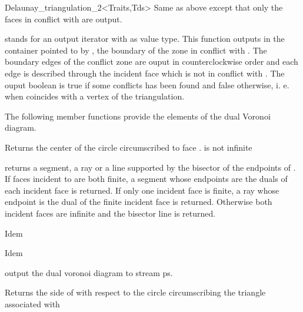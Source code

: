 \begin{ccRefClass}{Delaunay_triangulation_2<Traits,Tds>}
{Same as above except that only the faces in conflict with 
are output.}

{  stands for an output iterator with  as value
type.
 This function  outputs in the container pointed to by ,
the boundary of the zone in conflict with . The boundary edges
of the conflict  zone are ouput in counterclockwise order
and each edge is described  through the incident face
which is not in conflict with .
The ouput boolean is true if some conflicts has been found and false
otherwise,
i. e. when  coincides with a vertex of the triangulation.}



The following member functions provide the elements of the
dual Voronoi diagram.

{Returns the center of the circle circumscribed to face .
\ccPrecond {} is not infinite}

{returns a segment, a ray or a line supported by the bisector of the
endpoints of .
If faces incident to  are both finite, a segment whose endpoints are the
duals of each incident face is returned. If only one incident face is
finite, a
ray whose endpoint is the dual of the finite incident face is returned.
Otherwise both incident faces
are infinite and the bisector line is returned.}

{Idem}

{Idem}

{output the dual voronoi diagram to stream ps.}


\ccPredicates
{}
\ccThreeToTwo

{Returns the side of  with respect to the circle circumscribing
 the triangle associated with }


\end{ccRefClass}
